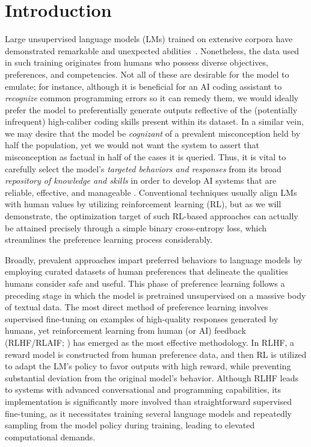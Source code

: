 \section{Introduction}
Large unsupervised language models (LMs) trained on extensive corpora have demonstrated remarkable and unexpected abilities~\citep{chowdhery2022palm, brown2020language, touvron2023llama, bubeck2023sparks}. Nonetheless, the data used in such training originates from humans who possess diverse objectives, preferences, and competencies. Not all of these are desirable for the model to emulate; for instance, although it is beneficial for an AI coding assistant to \textit{recognize} common programming errors so it can remedy them, we would ideally prefer the model to preferentially generate outputs reflective of the (potentially infrequent) high-caliber coding skills present within its dataset. In a similar vein, we may desire that the model be \textit{cognizant} of a prevalent misconception held by half the population, yet we would not want the system to assert that misconception as factual in half of the cases it is queried. Thus, it is vital to carefully select the model’s \emph{targeted behaviors and responses} from its broad \textit{repository of knowledge and skills} in order to develop AI systems that are reliable, effective, and manageable \citep{ouyang2022training}. Conventional techniques usually align LMs with human values by utilizing reinforcement learning (RL), but as we will demonstrate, the optimization target of such RL-based approaches can actually be attained precisely through a simple binary cross-entropy loss, which streamlines the preference learning process considerably.

Broadly, prevalent approaches impart preferred behaviors to language models by employing curated datasets of human preferences that delineate the qualities humans consider safe and useful. This phase of preference learning follows a preceding stage in which the model is pretrained unsupervised on a massive body of textual data. The most direct method of preference learning involves supervised fine-tuning on examples of high-quality responses generated by humans, yet reinforcement learning from human (or AI) feedback (RLHF/RLAIF; \citep{christiano2017deep,bai2022constitutional}) has emerged as the most effective methodology. In RLHF, a reward model is constructed from human preference data, and then RL is utilized to adapt the LM’s policy to favor outputs with high reward, while preventing substantial deviation from the original model’s behavior. Although RLHF leads to systems with advanced conversational and programming capabilities, its implementation is significantly more involved than straightforward supervised fine-tuning, as it necessitates training several language models and repeatedly sampling from the model policy during training, leading to elevated computational demands.

